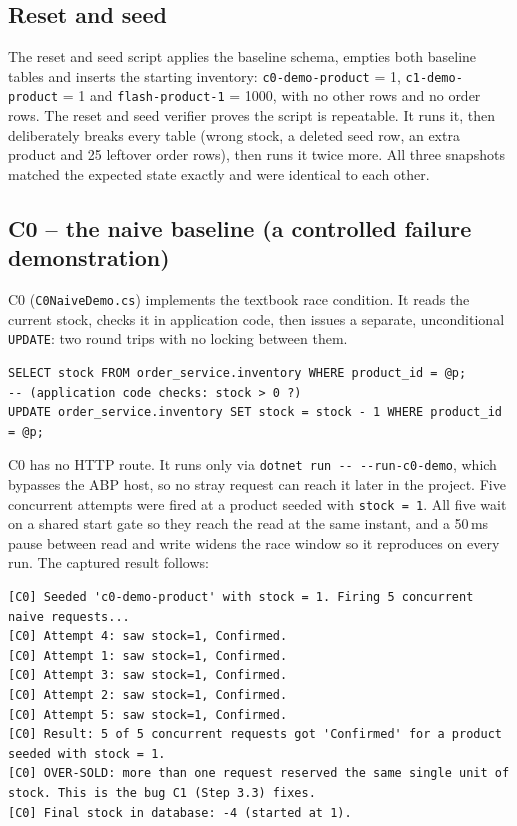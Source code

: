 \documentclass[a4paper]{report}
\begin{document}
\subsection{Reset and seed}

The reset and seed script applies the baseline schema, empties both
baseline tables and inserts the starting inventory: \texttt{c0-demo-product} = 1,
\texttt{c1-demo-product} = 1 and \texttt{flash-product-1} = 1000, with no other
rows and no order rows. The reset and seed verifier proves the script
is repeatable. It runs it, then deliberately breaks every table (wrong stock, a
deleted seed row, an extra product and 25 leftover order rows), then runs it
twice more. All three snapshots matched the expected state exactly and were
identical to each other.

\subsection{C0 -- the naive baseline (a controlled failure demonstration)}

C0 (\texttt{C0NaiveDemo.cs})
implements the textbook race condition. It reads the current stock, checks it
in application code, then issues a separate, unconditional \texttt{UPDATE}:
two round trips with no locking between them.

\begin{Verbatim}[breaklines=true,breakanywhere=true,fontsize=\footnotesize]
SELECT stock FROM order_service.inventory WHERE product_id = @p;
-- (application code checks: stock > 0 ?)
UPDATE order_service.inventory SET stock = stock - 1 WHERE product_id = @p;
\end{Verbatim}

C0 has no HTTP route. It runs only via \texttt{dotnet run -{}- -{}-run-c0-demo},
which bypasses the ABP host, so no stray request can reach it later in the
project. Five concurrent attempts were fired at a product seeded with
\texttt{stock = 1}. All five wait on a shared start gate so they reach the read
at the same instant, and a 50\,ms pause between read and write widens the race
window so it reproduces on every run. The captured result follows:

\begin{Verbatim}[breaklines=true,breakanywhere=true,fontsize=\footnotesize]
[C0] Seeded 'c0-demo-product' with stock = 1. Firing 5 concurrent naive requests...
[C0] Attempt 4: saw stock=1, Confirmed.
[C0] Attempt 1: saw stock=1, Confirmed.
[C0] Attempt 3: saw stock=1, Confirmed.
[C0] Attempt 2: saw stock=1, Confirmed.
[C0] Attempt 5: saw stock=1, Confirmed.
[C0] Result: 5 of 5 concurrent requests got 'Confirmed' for a product seeded with stock = 1.
[C0] OVER-SOLD: more than one request reserved the same single unit of stock. This is the bug C1 (Step 3.3) fixes.
[C0] Final stock in database: -4 (started at 1).
\end{Verbatim}
\end{document}
